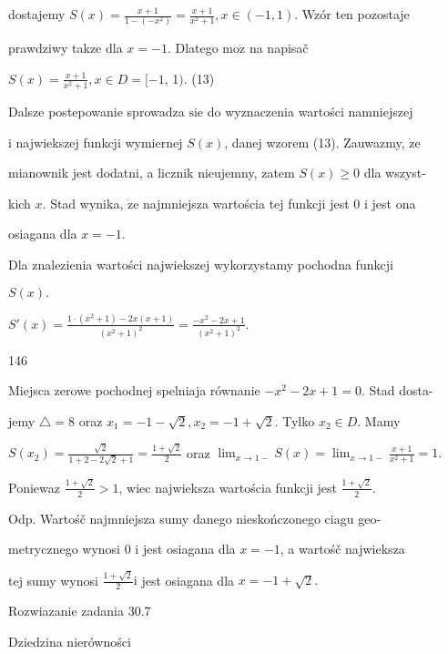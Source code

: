 \documentclass[a4paper,12pt]{article}
\begin{document}
dostajemy $S(x) =\displaystyle \frac{x+1}{1-(-x^{2})}=\frac{x+1}{x^{2}+1},  x\in (-1,1)$. Wzór ten pozostaje

prawdziwy takze dla $x=-1$. Dlatego $\mathrm{m}\mathrm{o}\dot{\mathrm{z}}$ na napisač

$S(x)=\displaystyle \frac{x+1}{x^{2}+1}, x\in D=[-1$, 1$)$.   (13)

Dalsze postepowanie sprowadza $\mathrm{s}\mathrm{i}\mathrm{e}$ do wyznaczenia wartości namniejszej

$\mathrm{i}$ najwiekszej funkcji wymiernej $S(x)$, danej wzorem (13). Zauwazmy, $\dot{\mathrm{z}}\mathrm{e}$

mianownik jest dodatni, a licznik nieujemny, zatem $S(x) \geq 0$ dla wszyst-

kich $x$. Stad wynika, $\dot{\mathrm{z}}\mathrm{e}$ najmniejsza wartościa tej funkcji jest 0 $\mathrm{i}$ jest ona

osiagana dla $x=-1.$

Dla znalezienia wartości najwiekszej wykorzystamy pochodna funkcji

$S(x).$

$S'(x)=\displaystyle \frac{1\cdot(x^{2}+1)-2x(x+1)}{(x^{2}+1)^{2}}=\frac{-x^{2}-2x+1}{(x^{2}+1)^{2}}.$





146

Miejsca zerowe pochodnej spelniaja równanie $-x^{2}-2x+1=0$. Stad dosta-

jemy $\triangle= 8$ oraz $x_{1} = -1-\sqrt{2}, x_{2} = -1+\sqrt{2}$. Tylko $x_{2} \in D$. Mamy

$S(x_{2}) = \displaystyle \frac{\sqrt{2}}{1+2-2\sqrt{2}+1} = \displaystyle \frac{1+\sqrt{2}}{2}$ oraz $\displaystyle \lim_{x\rightarrow 1-}S(x) = \displaystyle \lim_{x\rightarrow 1-}\frac{x+1}{x^{2}+1} = 1.$

Poniewaz $\displaystyle \frac{1+\sqrt{2}}{2}>1$, wiec najwieksza wartościa funkcji jest $\displaystyle \frac{1+\sqrt{2}}{2}.$

Odp. Wartośč najmniejsza sumy danego nieskończonego ciagu geo-

metrycznego wynosi 0 $\mathrm{i}$ jest osiagana dla $x = -1$, a wartośč najwieksza

tej sumy wynosi $\displaystyle \frac{1+\sqrt{2}}{2}\mathrm{i}$ jest osiagana dla $x=-1+\sqrt{2}.$

Rozwiazanie zadania 30.7

Dziedzina nierówności
\end{document}
